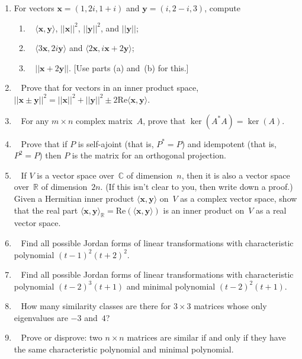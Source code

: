 \documentclass[11pt]{article}
\newcommand\score[1]{\marginpar{\vspace{-2ex}\color{blue}{#1/3}}\hspace{-1ex}}
\newcommand\0{\mathbf{0}}
\newcommand\CC{\mathbb{C}}
\newcommand\RR{\mathbb{R}}
\newcommand\xx{\mathbf{x}}
\newcommand\yy{\mathbf{y}}
\newcommand\<{\langle}
\renewcommand\>{\rangle}
\begin{document}
\begin{enumerate}
\item%
For vectors $\xx = (1, 2i, 1+i)$ and $\yy = (i, 2-i, 3)$, compute
\begin{enumerate}[itemsep=-1ex]
\item\ \score{}%
$\<\xx,\yy\>$, $||\xx||^2$, $||\yy||^2$, and $||\yy||$;
\item\ \score{}%
$\<3\xx,2i\yy\>$ and $\<2\xx,i\xx + 2\yy\>$;
\item\ \score{}%
$||\xx+2\yy||$.  [Use parts (a) and~(b) for this.]
\end{enumerate}

\item\ \score{}%
Prove that for vectors in an inner product space,
$||\xx\pm\yy||^2 = ||\xx||^2 + ||\yy||^2 \pm 2\mathrm{Re}\<\xx,\yy\>$.

\item\ \score{}%
For any $m \times n$ complex matrix~$A$, prove that $\ker(A^* A) =
\ker(A)$.

\item\ \score{}%
Prove that if $P$ is self-ajoint (that is, $P^* = P$) and idempotent
(that is, $P^2 = P$) then $P$ is the matrix for an orthogonal
projection.

\item\ \score{}%
If $V$ is a vector space over~$\CC$ of dimension~$n$, then it is also
a vector space over~$\RR$ of dimension~$2n$.  (If this isn't clear to
you, then write down a proof.)  Given a Hermitian inner product
$\<\xx,\yy\>$ on~$V$ as a complex vector space, show that the real
part $\<\xx,\yy\>_\RR = \mathrm{Re}(\<\xx,\yy\>)$ is an inner product
on~$V$ as a real vector space.

\item\ \score{}%
Find all possible Jordan forms of linear transformations with
characteristic polynomial $(t - 1)^2 (t + 2)^2$.

\item\ \score{}%
Find all possible Jordan forms of linear transformations with
characteristic polynomial $(t - 2)^3 (t + 1)$ and minimal polynomial
$(t - 2)^2 (t + 1)$.

\item\ \score{}%
How many similarity classes are there for $3 \times 3$ matrices whose
only eigenvalues are $-3$ and~$4$?

\item\ \score{}%
Prove or disprove: two $n \times n$ matrices are similar if and only
if they have the same characteristic polynomial and minimal
polynomial.
\end{enumerate}


\end{document}
